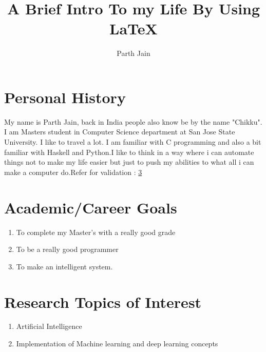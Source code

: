 \documentclass{article}
\author{Parth Jain}
\title{A Brief Intro To my Life By Using \LaTeX}
\begin{document}
\maketitle
\section{Personal History}\label{sec:personal history}
My name is Parth Jain, back in India people also know be by the name "Chikku". I am Masters student in Computer Science department at San Jose State University. I like to travel a lot. I am familiar with C programming and also a bit familiar with Haskell and Python.I like to think in a way where i can automate things not to make my life easier but just to push my abilities to what all i can make a computer do.Refer for validation : \ref{sec:Research Topics of Interest}

\section{Academic/Career Goals}\label{sec:Academic/Career Goals}
\begin{enumerate}
\item To complete my Master's with a really good grade
\item To be a really good programmer
\item To make an intelligent system.
\end{enumerate}

\section{Research Topics of Interest}\label{sec:Research Topics of Interest}
\begin{enumerate}
\item Artificial Intelligence\cite{aipaper}
\item Implementation of Machine learning and deep learning concepts\cite{aibook} 
\end{enumerate}


\end{document}
